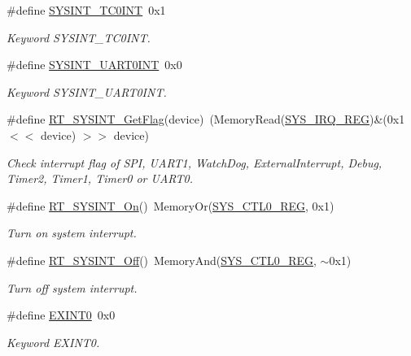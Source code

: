 \begin{DoxyCompactItemize}
\#define \mbox{\hyperlink{a00011_afda418bf07550de9ce626627e3cc46d0}{S\+Y\+S\+I\+N\+T\+\_\+\+T\+C0\+I\+NT}}~0x1
\begin{DoxyCompactList}\small\item\em Keyword S\+Y\+S\+I\+N\+T\+\_\+\+T\+C0\+I\+NT. \end{DoxyCompactList}\item 
\#define \mbox{\hyperlink{a00011_a5443d7bbceafb7ab2592b01489f23499}{S\+Y\+S\+I\+N\+T\+\_\+\+U\+A\+R\+T0\+I\+NT}}~0x0
\begin{DoxyCompactList}\small\item\em Keyword S\+Y\+S\+I\+N\+T\+\_\+\+U\+A\+R\+T0\+I\+NT. \end{DoxyCompactList}\item 
\#define \mbox{\hyperlink{a00011_a397366295a7d6d3ed47e5e3d69549448}{R\+T\+\_\+\+S\+Y\+S\+I\+N\+T\+\_\+\+Get\+Flag}}(device)~(Memory\+Read(\mbox{\hyperlink{a00020_ae3e6052bd0e6d9801c5380f2d8d94a17}{S\+Y\+S\+\_\+\+I\+R\+Q\+\_\+\+R\+EG}})\&(0x1 $<$$<$ device) $>$$>$ device)
\begin{DoxyCompactList}\small\item\em Check interrupt flag of S\+PI, U\+A\+R\+T1, Watch\+Dog, External\+Interrupt, Debug, Timer2, Timer1, Timer0 or U\+A\+R\+T0. \end{DoxyCompactList}\item 
\#define \mbox{\hyperlink{a00011_a5ddacb2147f802d2af2f507e41043504}{R\+T\+\_\+\+S\+Y\+S\+I\+N\+T\+\_\+\+On}}()~Memory\+Or(\mbox{\hyperlink{a00020_ab34acec79daf4fcc12a662cde9e75df7}{S\+Y\+S\+\_\+\+C\+T\+L0\+\_\+\+R\+EG}}, 0x1)
\begin{DoxyCompactList}\small\item\em Turn on system interrupt. \end{DoxyCompactList}\item 
\#define \mbox{\hyperlink{a00011_a9c68b82296205323f01358d9a27813a9}{R\+T\+\_\+\+S\+Y\+S\+I\+N\+T\+\_\+\+Off}}()~Memory\+And(\mbox{\hyperlink{a00020_ab34acec79daf4fcc12a662cde9e75df7}{S\+Y\+S\+\_\+\+C\+T\+L0\+\_\+\+R\+EG}}, $\sim$0x1)
\begin{DoxyCompactList}\small\item\em Turn off system interrupt. \end{DoxyCompactList}\item 
\#define \mbox{\hyperlink{a00011_a2e3f727d359d26314631842394f4a223}{E\+X\+I\+N\+T0}}~0x0
\begin{DoxyCompactList}\small\item\em Keyword E\+X\+I\+N\+T0. \end{DoxyCompactList}\item 

\end{DoxyCompactItemize}
